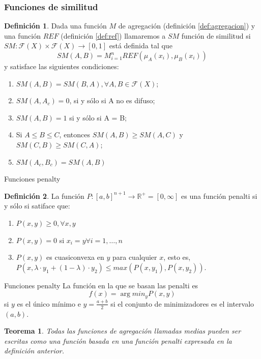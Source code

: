 \documentclass{beamer}
\theoremstyle{plain} %
\newtheorem{thm}{Teorema}
\theoremstyle{definition}
\newtheorem{defn}{Definición}
\def\RR{\mathbb{R}}
\def\FF{\mathcal{F}}
\begin{document}
\begin{frame}[squeeze]
  \frametitle{Funciones de similitud}
  \begin{defn}\label{def:similitud}
  Dada una función $M$ de agregación (definición \ref{def:agregacion}) y una función $REF$ (definición \ref{def:ref}) llamaremos a $SM$ función de similitud si $SM : \FF(X) \times \FF(X) \rightarrow [0,1]$ está definida tal que
  $$SM(A,B)=M^n_{i=1}REF(\mu_A(x_i), \mu_B(x_i))$$
  y satisface las siguientes condiciones:
    \begin{enumerate}
    \item $SM(A, B) = SM(B, A), \forall A, B \in \FF(X)$;
    \item $SM(A, A_c) = 0$, si y sólo si A no es difuso;
    \item $SM(A, B) = 1$ si y sólo si A = B;
    \item Si $A\leq B\leq C$, entonces $SM(A, B)\geq SM(A,C)$ y $SM(C, B)\geq SM(C,A)$;
    \item $SM(A_c, B_c) = SM(A,B)$
    \end{enumerate}
  \end{defn}
\end{frame}

\begin{frame}{Funciones penalty}
  \begin{defn}\label{def:penalti}
  La función $P:[a,b]^{n+1}\rightarrow \RR^{+} = [0, \infty]$ es una función penalti si y sólo si satiface que:
  \begin{enumerate}
    \item $P(x, y) \geq 0, \forall x, y$
    \item $P(x, y) = 0$ si $x_{i}=y \forall i=1,\dots ,n$
    \item $P(x,y)$ es cuasiconvexa en $y$ para cualquier $x$, esto es, $P(x, \lambda\cdot y_{1} +(1-\lambda)\cdot y_{2})\leq max(P(x, y_{1}), P(x, y_{2}))$.
  \end{enumerate}
  \end{defn}
\end{frame}

\begin{frame}{Funciones penalty}
  La función en la que se basan las penalti es $$f(x)=\arg min_{y} P(x,y)$$ si $y$ es el único mínimo e $y=\frac{a+b}{2}$ si el conjunto de minimizadores es el intervalo $(a, b)$.

  \begin{thm}
  Todas las funciones de agregación llamadas medias pueden ser escritas como una función basada en una función penalti expresada en la definición anterior.
  \end{thm}
\end{frame}
\end{document}
